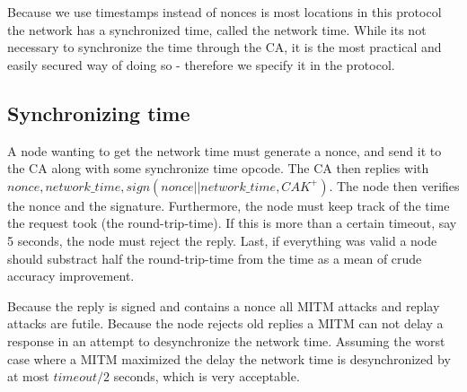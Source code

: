 \documentclass[12pt]{article}
\begin{document}
Because we use timestamps instead of nonces is most locations in this protocol
the network has a synchronized time, called the network time. While its not
necessary to synchronize the time through the CA, it is the most practical and
easily secured way of doing so - therefore we specify it in the protocol.

\subsection{Synchronizing time}

A node wanting to get the network time must generate a nonce, and send it to
the CA along with some synchronize time opcode. The CA then replies with
$nonce, network\_time, sign(nonce || network\_time, CAK^+)$. The node then
verifies the nonce and the signature. Furthermore, the node must keep track of
the time the request took (the round-trip-time). If this is more than a certain
timeout, say 5 seconds, the node must reject the reply. Last, if everything
was valid a node should substract half the round-trip-time from the time as a
mean of crude accuracy improvement.

Because the reply is signed and contains a nonce all MITM attacks and replay
attacks are futile. Because the node rejects old replies a MITM can not delay
a response in an attempt to desynchronize the network time. Assuming the worst
case where a MITM maximized the delay the network time is desynchronized by at
most $timeout/2$ seconds, which is very acceptable.





\end{document}
